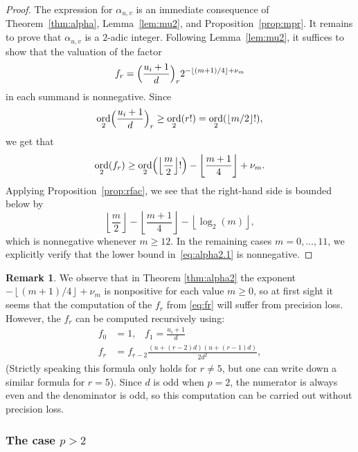 \documentclass[a4paper,11pt]{article}
\numberwithin{equation}{section}
\providecommand{\floor}[1]{\left\lfloor#1\right\rfloor}   %
\DeclareMathOperator{\ord}{ord}          %
\theoremstyle{definition}
\newtheorem{rem}[thm]{Remark}
\begin{document}
\begin{proof}
The expression for $\alpha_{u,v}$ is an immediate consequence 
of Theorem~\ref{thm:alpha}, Lemma~\ref{lem:mu2}, and
Proposition~\ref{prop:mpr}. It remains to prove that 
$\alpha_{u,v}$ is a $2$-adic integer.  Following Lemma~\ref{lem:mu2}, 
it suffices to show that the valuation of the factor 
\begin{equation} \label{eq:fr}
f_r=\Bigl(\frac{u_i+1}{d}\Bigr)_r 2^{- \floor{(m+1)/4} + \nu_m}
\end{equation}
in each summand is nonnegative. Since
\[
\ord_{2} \Bigl(\frac{u_i+1}{d}\Bigr)_r \geq \ord_{2}(r!) = \ord_{2}(\floor{m/2}!),
\] 
we get that 
\begin{equation} \label{eq:alpha2.1}
\ord_{2}(f_r)
\geq \ord_{2} \Bigl(\floor{\frac{m}{2}}!\Bigr) - \floor{\frac{m+1}{4}} + \nu_m.
\end{equation}
Applying Proposition~\ref{prop:rfac}, we see that the right-hand side 
is bounded below by 
\begin{equation*}
\floor{\frac{m}{2}} - \floor{\frac{m+1}{4}} - \floor{\log_2(m)},
\end{equation*}
which is nonnegative whenever $m \geq 12$.  In the remaining 
cases $m = 0, \dotsc, 11$, we explicitly verify that the 
lower bound in~\eqref{eq:alpha2.1} is nonnegative.
\end{proof}

\begin{rem}
We observe that in Theorem \ref{thm:alpha2} the exponent 
$-\floor{(m+1)/4}+\nu_m$ is nonpositive for each value $m \geq 0$, 
so at first sight it seems that the computation of the $f_r$ from
\eqref{eq:fr} will suffer from precision loss. However, the $f_r$
can be computed recursively using:
\begin{align*}
f_0 &=1, \; \; \; f_1=\frac{u_i+1}{d} \\
f_r & = f_{r-2} \frac{(u + (r - 2)d)(u + (r - 1)d)}{2d^2} ,
\end{align*}
(Strictly speaking this formula only holds for $r \neq 5$, but one can write down a similar formula for $r=5$).
Since $d$ is odd when $p=2$, the numerator is always even and the denominator is odd,
so this computation can be carried out without precision loss.
\end{rem}

\subsubsection{The case $p > 2$}
\end{document}
